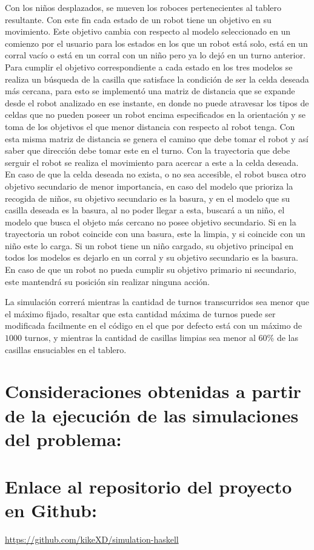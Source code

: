 \documentclass[titlepage,11pt]{scrartcl}
\begin{document}
Con los niños desplazados, se mueven los roboces pertenecientes al tablero resultante. Con este fin cada estado de un robot tiene un objetivo en su movimiento. Este objetivo cambia con respecto al modelo seleccionado en un comienzo por el usuario para los estados en los que un robot está solo, está en un corral vacío o está en un corral con un niño pero ya lo dejó en un turno anterior. Para cumplir el objetivo correspondiente a cada estado en los tres modelos se realiza un búsqueda de la casilla que satisface la condición de ser la celda deseada más cercana, para esto se implementó una matriz de distancia que se expande desde el robot analizado en ese instante, en donde no puede atravesar los tipos de celdas que no pueden poseer un robot encima especificados en la orientación y se toma de los objetivos el que menor distancia con respecto al robot tenga. Con esta misma matriz de distancia se genera el camino que debe tomar el robot y así saber que dirección debe tomar este en el turno. Con la trayectoria que debe serguir el robot se realiza el movimiento para acercar a este a la celda deseada. En caso de que la celda deseada no exista, o no sea accesible, el robot busca otro objetivo secundario de menor importancia, en caso del modelo que prioriza la recogida de niños, su objetivo secundario es la basura, y en el modelo que su casilla deseada es la basura, al no poder llegar a esta, buscará a un niño, el modelo que busca el objeto más cercano no posee objetivo secundario. Si en la trayectoria un robot coincide con una basura, este la limpia, y si coincide con un niño este lo carga. Si un robot tiene un niño cargado, su objetivo principal en todos los modelos es dejarlo en un corral y su objetivo secundario es la basura. En caso de que un robot no pueda cumplir su objetivo primario ni secundario, este mantendrá su posición sin realizar ninguna acción.

La simulación correrá mientras la cantidad de turnos transcurridos sea menor que el máximo fijado, resaltar que esta cantidad máxima de turnos puede ser modificada facilmente en el código en el que por defecto está con un máximo de $1000$ turnos, y mientras la cantidad de casillas limpias sea menor al 60\% de las casillas ensuciables en el tablero.

\section{Consideraciones obtenidas a partir de la ejecución de las simulaciones del problema:}

\section{Enlace al repositorio del proyecto en Github:}
\url{https://github.com/kikeXD/simulation-haskell}
\end{document}
